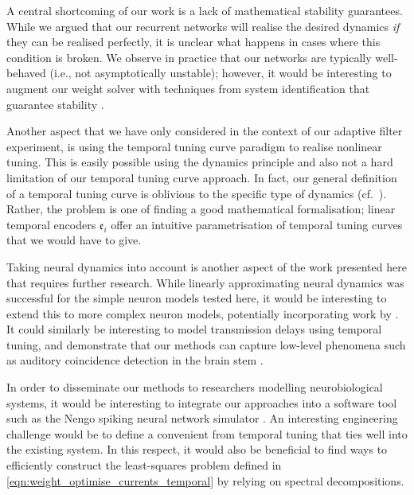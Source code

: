 A central shortcoming of our work is a lack of mathematical stability guarantees.
While we argued that our recurrent networks will realise the desired dynamics \emph{if} they can be realised perfectly, it is unclear what happens in cases where this condition is broken.
We observe in practice that our networks are typically well-behaved (i.e., not asymptotically unstable); however, it would be interesting to augment our weight solver with techniques from system identification that guarantee stability \citep[cf.][]{verhaegen2007filtering}.

Another aspect that we have only considered in the context of our adaptive filter experiment, is using the temporal tuning curve paradigm to realise nonlinear tuning.
This is easily possible using the \NEF dynamics principle \citep[Chapter~8]{eliasmith2003neural} and also not a hard limitation of our temporal tuning curve approach.
In fact, our general definition of a temporal tuning curve is oblivious to the specific type of dynamics (cf.~).
Rather, the problem is one of finding a good mathematical formalisation; linear temporal encoders $\mathfrak{e}_i$ offer an intuitive parametrisation of temporal tuning curves that we would have to give.

Taking neural dynamics into account is another aspect of the work presented here that requires further research.
While linearly approximating neural dynamics was successful for the simple neuron models tested here, it would be interesting to extend this to more complex neuron models, potentially incorporating work by \citet{duggins2017incorporating}.
It could similarly be interesting to model transmission delays using temporal tuning, and demonstrate that our methods can capture low-level phenomena such as auditory coincidence detection in the brain stem \citep[Chapter~31]{kandel2012principles}.

In order to disseminate our methods to researchers modelling neurobiological systems, it would be interesting to integrate our approaches into a software tool such as the Nengo spiking neural network simulator \citep{bekolay2014nengo}.
An interesting engineering challenge would be to define a convenient \API from temporal tuning that ties well into the existing system.
In this respect, it would also be beneficial to find ways to efficiently construct the least-squares problem defined in \cref{eqn:weight_optimise_currents_temporal} by relying on spectral decompositions.
